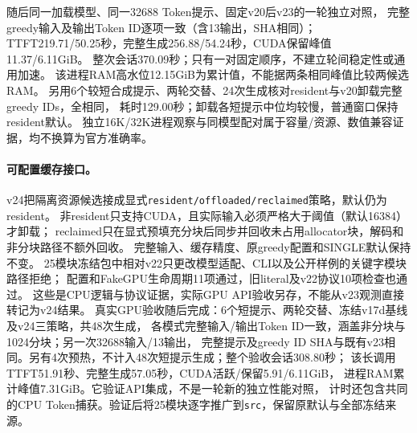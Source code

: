 \documentclass[UTF8,a4paper,11pt,fontset=fandol]{ctexart}
\begin{document}
随后同一加载模型、同一32688 Token提示、固定v20后v23的一轮独立对照，
完整greedy输入及输出Token ID逐项一致（含13输出，SHA相同）；
TTFT219.71/50.25秒，完整生成256.88/54.24秒，CUDA保留峰值11.37/6.11GiB。
整次会话370.09秒；只有一对固定顺序，不建立轮间稳定性或通用加速。
该进程RAM高水位12.15GiB为累计值，不能据两条相同峰值比较两候选RAM。
另用6个较短合成提示、两轮交替、24次生成核对resident与v20卸载完整greedy IDs，全相同，
耗时129.00秒；卸载各短提示中位均较慢，普通窗口保持resident默认。
独立16K/32K进程观察与同模型配对属于容量/资源、数值兼容证据，均不换算为官方准确率。

\paragraph{可配置缓存接口。}
v24把隔离资源候选接成显式\texttt{resident/offloaded/reclaimed}策略，默认仍为resident。
非resident只支持CUDA，且实际输入必须严格大于阈值（默认16384）才卸载；
reclaimed只在显式预填充分块后同步并回收未占用allocator块，解码和非分块路径不额外回收。
完整输入、缓存精度、原greedy配置和SINGLE默认保持不变。
25模块冻结包中相对v22只更改模型适配、CLI以及公开样例的关键字模块路径拒绝；
配置和FakeGPU生命周期11项通过，旧literal及v22协议10项检查也通过。
这些是CPU逻辑与协议证据，实际GPU API验收另存，不能从v23观测直接转记为v24结果。
真实GPU验收随后完成：6个短提示、两轮交替、冻结v17d基线及v24三策略，共48次生成，
各模式完整输入/输出Token ID一致，涵盖非分块与1024分块；另一次32688输入/13输出，
完整提示及greedy ID SHA与既有v23相同。另有4次预热，不计入48次短提示生成；整个验收会话308.80秒；
该长调用TTFT51.91秒、完整生成57.05秒，CUDA活跃/保留5.91/6.11GiB，
进程RAM累计峰值7.31GiB。它验证API集成，不是一轮新的独立性能对照，
计时还包含共同的CPU Token捕获。验证后将25模块逐字推广到\texttt{src}，保留原默认与全部冻结来源。
\end{document}
